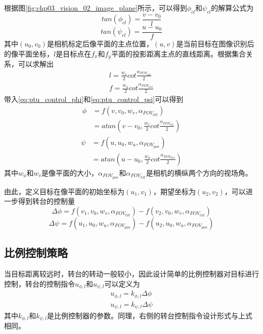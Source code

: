 根据图\ref{fig:chp03_vision_02_image_plane}所示，可以得到$\phi_{cl}$和$\psi_{cl}$的解算公式为
\begin{equation}
\label{eq:ptu_control_phi}
tan(\phi_{cl})=\frac{v-v_0}{l}
\end{equation}
\begin{equation}
\label{eq:ptu_control_psi}
tan(\psi_{cl})=\frac{u-u_0}{f}
\end{equation}
其中$(u_0, v_0)$是相机标定后像平面的主点位置，$(u, v)$是当前目标在图像识别后的像平面坐标，$l$是目标点在$f_x$和$f_y$平面的投影距离主点的直线距离。根据集合关系，可以求解出
\begin{align}
l = \frac{w_v}{2}cot \frac{\alpha_{FOV_{tilt}}}{2} \\
f = \frac{w_u}{2}cot\frac{\alpha_{FOV_{pan}}}{2}
\end{align}
带入\ref{eq:ptu_control_phi}和\ref{eq:ptu_control_psi}可以得到
\begin{align} \label{eq:FOV_TILT}
\phi &=f(v, v_0, w_v, \alpha_{FOV_{tilt}}) \\
&=atan(v-v_0, \frac{w_v}{2}cot \frac{\alpha_{FOV_{tilt}}}{2})
\end{align}
\begin{align} \label{eq:FOV_PAN}
\psi &=f(u, u_0, w_u, \alpha_{FOV_{pan}}) \\
&=atan(u-u_0, \frac{w_u}{2}cot\frac{\alpha_{FOV_{pan}}}{2})
\end{align}
其中$w_u$和$w_v$是像平面的大小，$\alpha_{FOV_{pan}}$和$\alpha_{FOV_{tilt}}$是相机的横纵两个方向的视场角。

由此，定义目标在像平面的初始坐标为$(u_1, v_1)$，期望坐标为$(u_2, v_2)$，可以进一步得到转台的控制量
\begin{equation}
\Delta\phi=f(v_1,v_0,w_v, \alpha_{FOV_{tilt}})-f(v_2,v_0, w_v, \alpha_{FOV_{tilt}})
\end{equation}
\begin{equation}
\Delta\psi=f(u_1,u_0,w_u, \alpha_{FOV_{pan}})-f(u_2,u_0, w_u, \alpha_{FOV_{pan}})
\end{equation}

\subsection{比例控制策略}
当目标距离较远时，转台的转动一般较小，因此设计简单的比例控制器对目标进行控制，转台的控制指令$u_{\phi,l}$和$u_{\psi,l}$可以定义为
\begin{align}
u_{\phi,l} = k_{\phi,l}\Delta\phi\\
u_{\psi,l} = k_{\psi,l}\Delta\psi
\end{align}
其中$k_{\phi,l}$和$k_{\psi,l}$是比例控制器的参数。同理，右侧的转台控制指令设计形式与上式相同。

